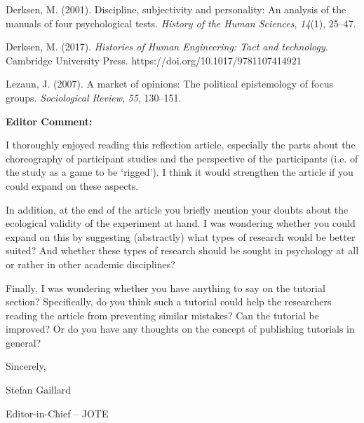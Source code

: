 \documentclass[a4paper]{article}
\begin{document}
Derksen, M. (2001). Discipline, subjectivity and personality: An analysis of the manuals of four psychological tests. \textit{History of the Human Sciences}, \textit{14}(1), 25--47.

Derksen, M. (2017). \textit{Histories of Human Engineering: Tact and technology}. Cambridge University Press. https://doi.org/10.1017/9781107414921

Lezaun, J. (2007). A market of opinions: The political epistemology of focus groups. \textit{Sociological Review}, \textit{55}, 130--151.

\bigskip


\bigskip


\bigskip


\bigskip

\clearpage
\textbf{Editor Comment: }

I thoroughly enjoyed reading this reflection article, especially the parts about the choreography of participant studies and the perspective of the participants (i.e. of the study as a game to be `rigged'). I think it would strengthen the article if you could expand on these aspects. \ 

In addition, at the end of the article you briefly mention your doubts about the ecological validity of the experiment at hand. I was wondering whether you could expand on this by suggesting (abstractly) what types of research would be better suited? And whether these types of research should be sought in psychology at all or rather in other academic disciplines? \ 

Finally, I was wondering whether you have anything to say on the tutorial section? Specifically, do you think such a tutorial could help the researchers reading the article from preventing similar mistakes? Can the tutorial be improved? Or do you have any thoughts on the concept of publishing tutorials in general? \ 


\bigskip

Sincerely, 

Stefan Gaillard

Editor-in-Chief -- JOTE 


\bigskip
\end{document}
